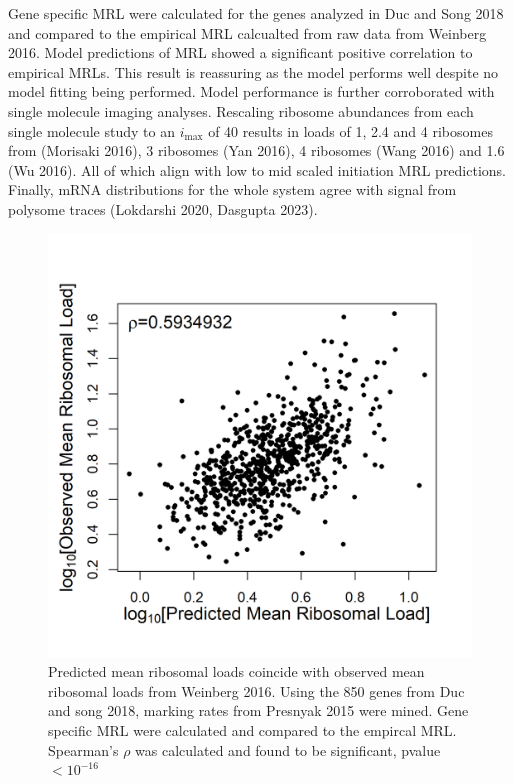 \documentclass[review]{elsarticle}
\newcommand{\imax}{\ensuremath{{i_{\max}}}\xspace}
\begin{document}
Gene specific MRL were calculated for the genes analyzed in Duc and Song 2018 and compared to the empirical MRL calcualted from raw data from Weinberg 2016. Model predictions of MRL showed a significant positive correlation to empirical MRLs. This result is reassuring as the model performs well despite no model fitting being performed. Model performance is further corroborated with single molecule imaging analyses. Rescaling ribosome abundances from each single molecule study to an \imax of 40 results in loads of 1, 2.4 and 4 ribosomes from (Morisaki 2016), 3 ribosomes (Yan 2016), 4 ribosomes (Wang 2016) and 1.6 (Wu 2016). All of which align with low to mid scaled initiation MRL predictions. Finally, mRNA distributions for the whole system agree with signal from polysome traces (Lokdarshi 2020, Dasgupta 2023).

\begin{figure}[!ht]
\centering
\includegraphics[width=120mm]{Images/Duc_Song_vs_model_log.png}
\caption{Predicted mean ribosomal loads coincide with observed mean ribosomal loads from Weinberg 2016. Using the 850 genes from Duc and song 2018, marking rates from Presnyak 2015 were mined. Gene specific MRL were calculated and compared to the empircal MRL. Spearman's $\rho$ was calculated and found to be significant, pvalue $<10^{-16}$}
\end{figure}
\clearpage 
\end{document}
